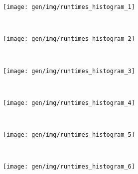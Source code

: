 \begin{subfigure}[h]{.32\textwidth}
\centering
\texttt{[image: gen/img/runtimes\_histogram\_1]}
\vspace{-1.5em} %
\caption{}
\label{fig:performance-wg-c}
\end{subfigure}
~%
\begin{subfigure}[h]{.32\textwidth}
\centering
\texttt{[image: gen/img/runtimes\_histogram\_2]}
\vspace{-1.5em} %
\caption{}
\label{fig:performance-wg-r}
\end{subfigure}
~%
\begin{subfigure}[h]{.32\textwidth}
\centering
\texttt{[image: gen/img/runtimes\_histogram\_3]}
\vspace{-1.5em} %
\caption{}
\label{fig:performance-wg-r}
\end{subfigure}
\\
\begin{subfigure}[h]{.32\textwidth}
\centering
\texttt{[image: gen/img/runtimes\_histogram\_4]}
\vspace{-1.5em} %
\caption{}
\label{fig:performance-wg-c}
\end{subfigure}
~%
\begin{subfigure}[h]{.32\textwidth}
\centering
\texttt{[image: gen/img/runtimes\_histogram\_5]}
\vspace{-1.5em} %
\caption{}
\label{fig:performance-wg-r}
\end{subfigure}
~%
\begin{subfigure}[h]{.32\textwidth}
\centering
\texttt{[image: gen/img/runtimes\_histogram\_6]}
\vspace{-1.5em} %
\caption{}
\label{fig:performance-wg-r}
\end{subfigure}
